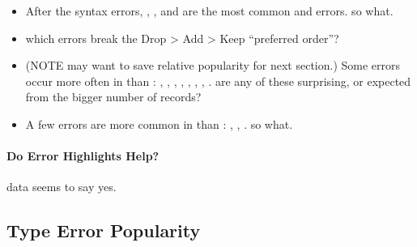 \documentclass[english,submission,cleveref]{programming}
\begin{document}
\begin{itemize}

  \item
    After the syntax errors, ,
    , and  are the most common
    \mnonstrict{} and \mstrict{} errors.
    \FILL{} so what.

  \item
    \FILL{} which errors break the Drop > Add > Keep ``preferred order''?

  \item
    (NOTE may want to save relative popularity for next section.)
    Some errors occur more often in \mnonstrict{} than \mstrict{}:
    ,
    ,
    ,
    ,
    ,
    ,
    ,
    .
    \QALAN{} are any of these surprising, or expected from the bigger number of
    \mnonstrict{} records?

  \item
    A few errors are more common in \mstrict{} than \mnonstrict{}:
    ,
    ,
    .
    \FILL{} so what.

\end{itemize}


\paragraph{Do Error Highlights Help?}

\FILL{} data seems to say yes.


\subsection{Type Error Popularity}
\label{s:type-error-count}
\end{document}
